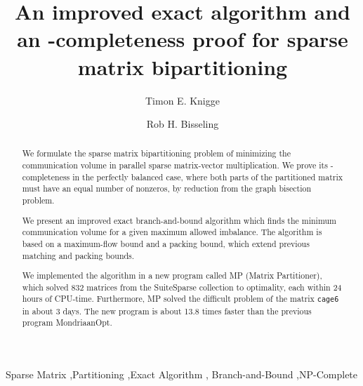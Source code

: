 \documentclass[5p,times]{elsarticle}
\begin{document}
	\title{An improved exact algorithm and an \NP-completeness proof for sparse matrix bipartitioning}

	\author[timon]{Timon E. Knigge}
	\address[timon]{ETH Z\"urich\\
				Z\"urich, Switzerland}

	\author[rob]{Rob H. Bisseling}
	\address[rob]{Mathematical Institute,
				Utrecht University\\
				Utrecht, The Netherlands}


	\begin{abstract}
		We formulate the sparse matrix bipartitioning problem of
		minimizing the communication volume in parallel sparse
		matrix-vector multiplication. We prove its \NP-completeness
		in the perfectly balanced case, where both parts of the
		partitioned matrix must have an equal number of nonzeros,
		by reduction from the graph bisection problem.

		We present an improved exact branch-and-bound algorithm
		which finds the minimum communication volume for a given
		maximum allowed imbalance. The algorithm is based on a
		maximum-flow bound and a packing bound, which extend
		previous matching and packing bounds.

		We implemented the algorithm in a new program called MP
		(Matrix Partitioner), which solved 832 matrices from the
		SuiteSparse collection to optimality, each within 24 hours
		of CPU-time. Furthermore, MP solved the difficult problem
		of the matrix \texttt{cage6} in about 3 days. The new
		program is about 13.8 times faster than the previous program
		MondriaanOpt.
	\end{abstract}
	\begin{keyword}
		Sparse Matrix \sep Partitioning \sep Exact Algorithm \sep
		Branch-and-Bound \sep NP-Complete
	\end{keyword}

	\maketitle


	
	
	
	
	
	

	
	
\end{document}
